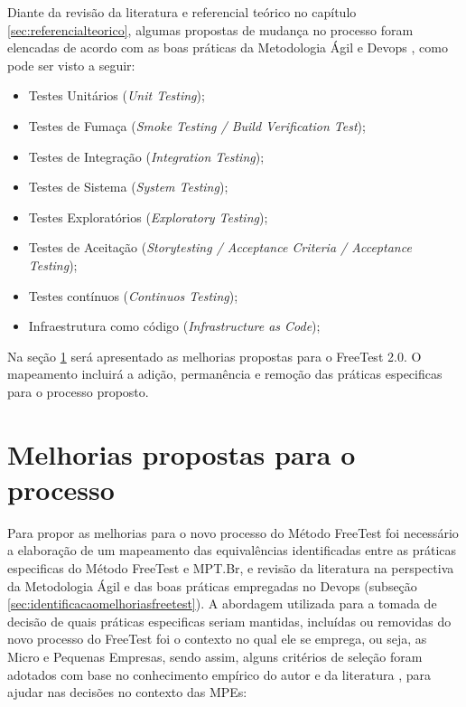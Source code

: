 Diante da revisão da literatura e referencial teórico no capítulo \ref{sec:referencialteorico}, algumas propostas de mudança no processo foram elencadas de acordo com as boas práticas da Metodologia Ágil \cite{Beck2001,Debois2008} e Devops \cite{Howlett,Fitzgerald2014,Erich2014}, como pode ser visto a seguir:

\begin{itemize}
    \item Testes Unitários (\textit{Unit Testing});
    \item Testes de Fumaça (\textit{Smoke Testing / Build Verification Test});
    \item Testes de Integração (\textit{Integration Testing});
    \item Testes de Sistema (\textit{System Testing});
    \item Testes Exploratórios (\textit{Exploratory Testing});
    \item Testes de Aceitação (\textit{Storytesting / Acceptance Criteria / Acceptance Testing});
    \item Testes contínuos (\textit{Continuos Testing});
    \item Infraestrutura como código (\textit{Infrastructure as Code})\cite{BRAGA2015};
\end{itemize}

Na seção \ref{sec:melhoriaspropostas} será apresentado as melhorias propostas para o FreeTest 2.0. O mapeamento incluirá a adição, permanência e remoção das práticas especificas para o processo proposto.

\section{Melhorias propostas para o processo}
\label{sec:melhoriaspropostas}

Para propor as melhorias para o novo processo do Método FreeTest foi necessário a elaboração de um mapeamento das equivalências identificadas entre as práticas especificas do Método FreeTest e MPT.Br, e revisão da literatura na perspectiva da Metodologia Ágil e das boas práticas empregadas no Devops (subseção \ref{sec:identificacaomelhoriasfreetest}).
A abordagem utilizada para a tomada de decisão de quais práticas especificas seriam mantidas, incluídas ou removidas do novo processo do FreeTest foi o contexto no qual ele se emprega, ou seja, as Micro e Pequenas Empresas, sendo assim, alguns critérios de seleção foram adotados com base no conhecimento empírico do autor e da literatura \cite{JamesWhittakerJasonCarollo2012, Especialistas2015, Whittaker2009, ABESSofftware2014, FelipeDreher2016, Laporte2010, Ramachandram2008, SilvaDias2015}, para ajudar nas decisões no contexto das MPEs:

